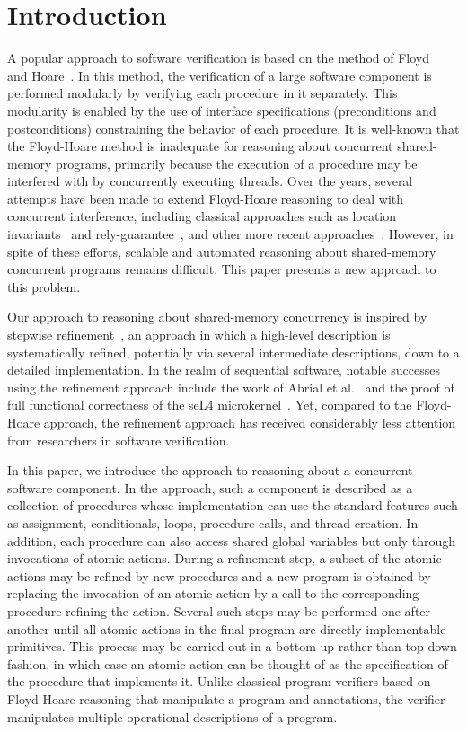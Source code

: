 \section{Introduction}
\label{sec:introduction}

A popular approach to software verification is based on the method of Floyd~\cite{Floyd67} and Hoare~\cite{Hoare69}.
In this method, the verification of a large software component is performed modularly by verifying each procedure in it separately.
This modularity is enabled by the use of interface specifications (preconditions and postconditions) constraining the behavior of each procedure.
It is well-known that the Floyd-Hoare method is inadequate for reasoning about concurrent shared-memory programs,
primarily because the execution of a procedure may be interfered with by concurrently executing threads.
Over the years, several attempts have been made to extend Floyd-Hoare reasoning to deal with concurrent interference, 
including classical approaches such as location invariants~\cite{Ashcroft75,OwickiG76} and rely-guarantee~\cite{Jones83},
and other more recent approaches~\cite{OHearn07,RGSep}.
However, in spite of these efforts, scalable and automated reasoning about shared-memory concurrent programs remains difficult.
This paper presents a new approach to this problem.

Our approach to reasoning about shared-memory concurrency is inspired by stepwise refinement~\cite{Dijkstra}, 
an approach in which a high-level description is systematically refined, 
potentially via several intermediate descriptions, down to a detailed implementation.
In the realm of sequential software, notable successes using the refinement approach include the work of Abrial et al.~\cite{AbrialBHHMV10}
and the proof of full functional correctness of the seL4 microkernel~\cite{Klein_AEMSKH_14}.
Yet, compared to the Floyd-Hoare approach, 
the refinement approach has received considerably less attention from researchers in software verification.

In this paper, we introduce the \civl approach to reasoning about a concurrent software component.
In the \civl approach, such a component is described as a collection of procedures whose implementation 
can use the standard features such as assignment, conditionals, loops, procedure calls, and thread creation. 
In addition, each procedure can also access shared global variables but only through invocations of atomic actions.
During a refinement step, a subset of the atomic actions may be refined by new procedures and a new program is 
obtained by replacing the invocation of an atomic action by a call to the corresponding procedure refining the action.
Several such steps may be performed one after another until all atomic actions in the final program are directly implementable primitives.
This process may be carried out in a bottom-up rather than top-down fashion, in which case an atomic action 
can be thought of as the specification of the procedure that implements it.
Unlike classical program verifiers based on Floyd-Hoare reasoning that manipulate a program and annotations, 
the \civl verifier manipulates multiple operational descriptions of a program. 

